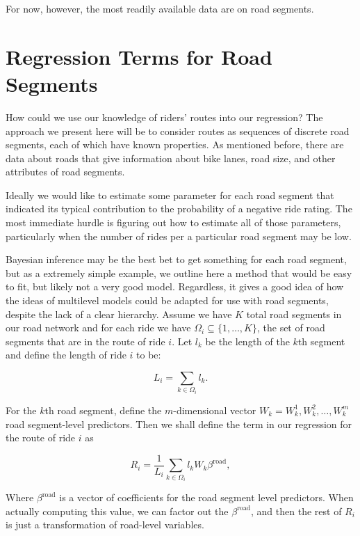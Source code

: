 \documentclass[12pt,twoside]{reedthesis}
\begin{document}
  For now, however, the most readily available data are on road segments.
  
  \section{Regression Terms for Road
  Segments}\label{regression-terms-for-road-segments}
  
  How could we use our knowledge of riders' routes into our regression?
  The approach we present here will be to consider routes as sequences of
  discrete road segments, each of which have known properties. As
  mentioned before, there are data about roads that give information about
  bike lanes, road size, and other attributes of road segments.
  
  Ideally we would like to estimate some parameter for each road segment
  that indicated its typical contribution to the probability of a negative
  ride rating. The most immediate hurdle is figuring out how to estimate
  all of those parameters, particularly when the number of rides per a
  particular road segment may be low.
  
  Bayesian inference may be the best bet to get something for each road
  segment, but as a extremely simple example, we outline here a method
  that would be easy to fit, but likely not a very good model. Regardless,
  it gives a good idea of how the ideas of multilevel models could be
  adapted for use with road segments, despite the lack of a clear
  hierarchy. Assume we have \(K\) total road segments in our road network
  and for each ride we have \(\Omega_i \subseteq \{1, \ldots, K\}\), the
  set of road segments that are in the route of ride \(i\). Let \(l_k\) be
  the length of the \(k\)th segment and define the length of ride \(i\) to
  be:
  
  \[ L_i = \sum_{k \in \Omega_i} l_k.\]
  
  For the \(k\)th road segment, define the \(m\)-dimensional vector
  \(W_k = W_k^1, W_k^2, \ldots, W_k^m\) road segment-level predictors.
  Then we shall define the term in our regression for the route of ride
  \(i\) as
  
  \[ R_i = \frac{1}{L_i} \sum_{k \in \Omega_i} l_k W_k \beta^{\text{road}},\]
  
  Where \(\beta^{\text{road}}\) is a vector of coefficients for the road
  segment level predictors. When actually computing this value, we can
  factor out the \(\beta^{\text{road}}\), and then the rest of \(R_i\) is
  just a transformation of road-level variables.
  
\end{document}
